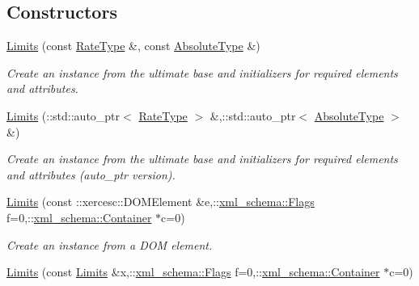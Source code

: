 \subsection*{Constructors}
\begin{DoxyCompactItemize}
\item 
\hypertarget{classopenstack_1_1xml_1_1Limits_a2d5ed7fde837095d94c3cd4a85f82e1f}{
\hyperlink{classopenstack_1_1xml_1_1Limits_a2d5ed7fde837095d94c3cd4a85f82e1f}{Limits} (const \hyperlink{classopenstack_1_1xml_1_1RateLimits}{RateType} \&, const \hyperlink{classopenstack_1_1xml_1_1AbsoluteLimits}{AbsoluteType} \&)}
\label{classopenstack_1_1xml_1_1Limits_a2d5ed7fde837095d94c3cd4a85f82e1f}

\begin{DoxyCompactList}\small\item\em Create an instance from the ultimate base and initializers for required elements and attributes. \item\end{DoxyCompactList}\item 
\hyperlink{classopenstack_1_1xml_1_1Limits_a61afef097865c68a2b6f4ea26fd2fc6a}{Limits} (::std::auto\_\-ptr$<$ \hyperlink{classopenstack_1_1xml_1_1RateLimits}{RateType} $>$ \&,::std::auto\_\-ptr$<$ \hyperlink{classopenstack_1_1xml_1_1AbsoluteLimits}{AbsoluteType} $>$ \&)
\begin{DoxyCompactList}\small\item\em Create an instance from the ultimate base and initializers for required elements and attributes (auto\_\-ptr version). \item\end{DoxyCompactList}\item 
\hyperlink{classopenstack_1_1xml_1_1Limits_a0d007c5775a1a71de529f7c27206e364}{Limits} (const ::xercesc::DOMElement \&e,::\hyperlink{namespacexml__schema_affb4c227cbd9aa7453dd1dc5a1401943}{xml\_\-schema::Flags} f=0,::\hyperlink{namespacexml__schema_a333dea2213742aea47a37532dec4ec27}{xml\_\-schema::Container} $\ast$c=0)
\begin{DoxyCompactList}\small\item\em Create an instance from a DOM element. \item\end{DoxyCompactList}\item 
\hyperlink{classopenstack_1_1xml_1_1Limits_a6194edd4c1066cdb83a977f597c4fb14}{Limits} (const \hyperlink{classopenstack_1_1xml_1_1Limits}{Limits} \&x,::\hyperlink{namespacexml__schema_affb4c227cbd9aa7453dd1dc5a1401943}{xml\_\-schema::Flags} f=0,::\hyperlink{namespacexml__schema_a333dea2213742aea47a37532dec4ec27}{xml\_\-schema::Container} $\ast$c=0)

\end{DoxyCompactItemize}
